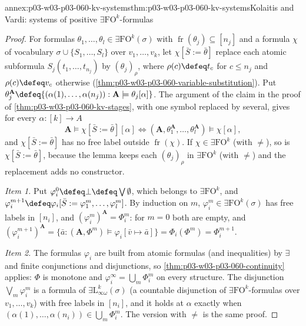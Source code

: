\begin{annexitem}{annex:p03-w03-p03-060-kv-systems}{thm:p03-w03-p03-060-kv-systems}{Kolaitis and Vardi: systems of positive \(\exists\mathrm{FO}^k\)-formulas}
\begin{proof}
For formulas \(\theta_1,\ldots,\theta_l\in\exists\mathrm{FO}^k(\sigma)\)
with \(\operatorname{fr}(\theta_j)\subseteq[n_j]\) and a formula \(\chi\)
of vocabulary \(\sigma\cup\{S_1,\ldots,S_l\}\) over \(v_1,\ldots,v_k\), let
\(\chi[\bar S:=\bar\theta]\) replace each atomic subformula
\(S_j(t_1,\ldots,t_{n_j})\) by \((\theta_j)_{\rho}\), where
\(\rho(c)\defeq t_c\) for \(c\le n_j\) and \(\rho(c)\defeq v_c\) otherwise
(\cref{thm:p03-w03-p03-060-variable-substitution}). Put
\(\theta_j^{\mathbf A}\defeq\{(\alpha(1),\ldots,\alpha(n_j)):\mathbf A\models\theta_j[\alpha]\}\).
The argument of the claim in the proof of
\cref{thm:p03-w03-p03-060-kv-stages}, with one symbol replaced by
several, gives for every \(\alpha\colon[k]\to A\)
\[
 \mathbf A\models\chi[\bar S:=\bar\theta][\alpha]\iff(\mathbf A,\theta_1^{\mathbf A},\ldots,\theta_l^{\mathbf A})\models\chi[\alpha],
\]
and \(\chi[\bar S:=\bar\theta]\) has no free label outside
\(\operatorname{fr}(\chi)\). If \(\chi\in\exists\mathrm{FO}^k\) (with
\(\neq\)), so is \(\chi[\bar S:=\bar\theta]\), because the lemma keeps each
\((\theta_j)_\rho\) in \(\exists\mathrm{FO}^k\) (with \(\neq\)) and the
replacement adds no constructor.

\emph{Item 1.} Put \(\varphi^0_i\defeq\bot\defeq\bigvee\emptyset\), which
belongs to \(\exists\mathrm{FO}^k\), and
\(\varphi^{m+1}_i\defeq\varphi_i[\bar S:=\varphi^m_1,\ldots,\varphi^m_l]\).
By induction on \(m\), \(\varphi^m_i\in\exists\mathrm{FO}^k(\sigma)\) has
free labels in \([n_i]\), and \((\varphi^m_i)^{\mathbf A}=\Phi^m_i\): for
\(m=0\) both are empty, and
\((\varphi^{m+1}_i)^{\mathbf A}=\{\bar a:(\mathbf A,\Phi^m)\models\varphi_i[\bar v\mapsto\bar a]\}=\Phi_i(\Phi^m)=\Phi^{m+1}_i\).

\emph{Item 2.} The formulas \(\varphi_i\) are built from atomic formulas
(and inequalities) by \(\exists\) and finite conjunctions and
disjunctions, so \cref{thm:p03-w03-p03-060-continuity} applies: \(\Phi\)
is monotone and \(\varphi^\infty_i=\bigcup_m\Phi^m_i\) on every structure.
The disjunction \(\bigvee_m\varphi^m_i\) is a formula of
\(\exists\mathrm{L}^k_{\infty\omega}(\sigma)\) (a countable disjunction of
\(\exists\mathrm{FO}^k\)-formulas over \(v_1,\ldots,v_k\)) with free labels
in \([n_i]\), and it holds at \(\alpha\) exactly when
\((\alpha(1),\ldots,\alpha(n_i))\in\bigcup_m\Phi^m_i\). The version with
\(\neq\) is the same proof.
\end{proof}
\end{annexitem}

